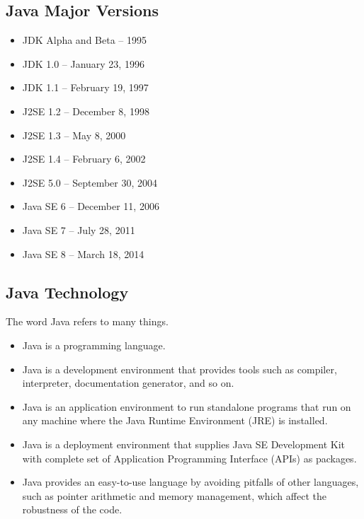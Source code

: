 \documentclass[11pt,a4paper]{article}
\begin{document}
\subsection*{Java Major Versions}
\begin{multicols}{2}
\begin{itemize}
    \item JDK Alpha and Beta -- 1995
    \item JDK 1.0 -- January 23, 1996
    \item JDK 1.1 -- February 19, 1997
    \item J2SE 1.2 -- December 8, 1998
    \item J2SE 1.3 -- May 8, 2000
    \end{itemize}
    \begin{itemize}
    \item J2SE 1.4 -- February 6, 2002
    \item J2SE 5.0 -- September 30, 2004
    \item Java SE 6 -- December 11, 2006
    \item Java SE 7 -- July 28, 2011
    \item Java SE 8 -- March 18, 2014 
\end{itemize}
\end{multicols}
\subsection*{Java Technology}
The word Java refers to many things.
\begin{itemize}
\item Java is a programming language.
\item Java is a development environment that provides tools such as compiler, interpreter, documentation generator, and so on.
\item Java is an application environment to run standalone programs that run on any machine where the Java Runtime Environment (JRE) is installed.
\item Java is a deployment environment that supplies Java SE Development Kit with complete set of Application Programming Interface (APIs) as packages.
\item Java provides an easy-to-use language by avoiding pitfalls of other languages, such as pointer arithmetic and memory management, which affect the robustness of the code.
\end{itemize}
\end{document}
